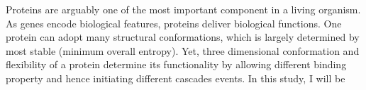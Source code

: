 Proteins are arguably one of the most important component in a living organism. As genes encode biological features, proteins deliver biological functions. One protein can adopt many structural conformations, which is largely determined by  most stable (minimum overall entropy). Yet, three dimensional conformation and flexibility of a protein determine its functionality by allowing different binding property and hence initiating different cascades events. In this study, I will be 